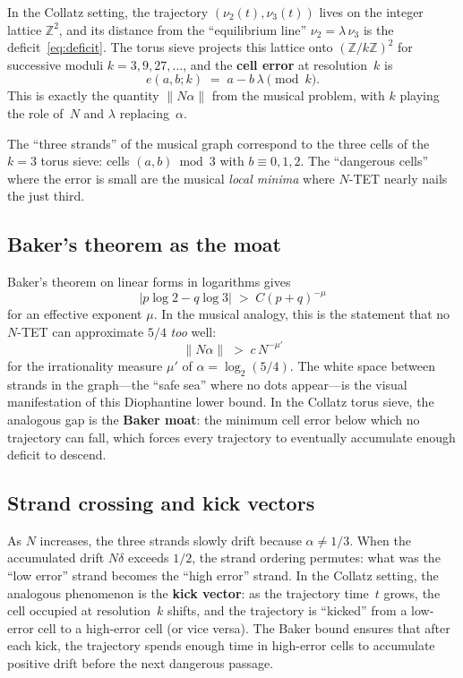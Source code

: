 \documentclass[12pt]{article}
\newcommand{\Z}{\mathbb{Z}}
\theoremstyle{plain}
\theoremstyle{definition}
\theoremstyle{remark}
\numberwithin{equation}{section}
\begin{document}
In the Collatz setting, the trajectory $(\nu_2(t), \nu_3(t))$ lives on
the integer lattice $\Z^2$, and its distance from the ``equilibrium line''
$\nu_2 = \lambda\,\nu_3$ is the deficit~\eqref{eq:deficit}.  The torus
sieve projects this lattice onto $(\Z/k\Z)^2$ for successive moduli
$k = 3, 9, 27, \ldots$, and the \textbf{cell error} at resolution~$k$ is
\[
  e(a,b;k) \;=\; a - b\,\lambda \pmod{k}.
\]
This is exactly the quantity $\|N\alpha\|$ from the musical problem,
with $k$ playing the role of~$N$ and $\lambda$ replacing~$\alpha$.

The ``three strands'' of the musical graph correspond to the three
cells of the $k=3$ torus sieve: cells $(a,b) \bmod 3$ with
$b \equiv 0, 1, 2$.  The ``dangerous cells'' where the error is small
are the musical \emph{local minima} where $N$-TET nearly nails the
just third.

\subsection{Baker's theorem as the moat}

Baker's theorem on linear forms in logarithms gives
\[
  |p\log 2 - q\log 3| \;>\; C(p+q)^{-\mu}
\]
for an effective exponent $\mu$.  In the musical analogy, this is
the statement that no $N$-TET can approximate $5/4$ \emph{too} well:
\[
  \|N\alpha\| \;>\; c\,N^{-\mu'}
\]
for the irrationality measure $\mu'$ of $\alpha = \log_2(5/4)$.
The white space between strands in the graph---the ``safe sea''
where no dots appear---is the visual manifestation of this
Diophantine lower bound.  In the Collatz torus sieve, the analogous
gap is the \textbf{Baker moat}: the minimum cell error below which
no trajectory can fall, which forces every trajectory to eventually
accumulate enough deficit to descend.

\subsection{Strand crossing and kick vectors}

As $N$ increases, the three strands slowly drift because $\alpha \neq 1/3$.
When the accumulated drift $N\delta$ exceeds $1/2$, the strand
ordering permutes: what was the ``low error'' strand becomes the
``high error'' strand.  In the Collatz setting, the analogous
phenomenon is the \textbf{kick vector}: as the trajectory time~$t$
grows, the cell occupied at resolution~$k$ shifts, and the trajectory
is ``kicked'' from a low-error cell to a high-error cell (or vice versa).
The Baker bound ensures that after each kick, the trajectory spends
enough time in high-error cells to accumulate positive drift before
the next dangerous passage.
\end{document}
